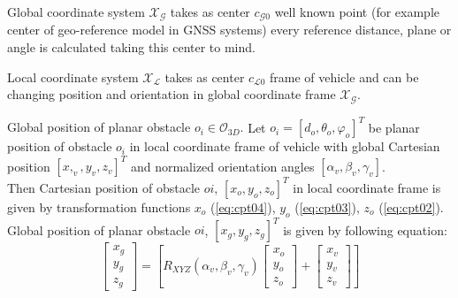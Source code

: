 \begin{definition}{Global coordinate system $\mathscr{X}_\mathscr{G}$}\label{def:globalCoordinateSystem}
    takes as center $c_{\mathscr{G}0}$ well known point (for example center of geo-reference model in GNSS systems) every reference distance, plane or angle is calculated taking this center to mind.
\end{definition}
\begin{definition}{Local coordinate system $\mathscr{X}_\mathscr{L}$}\label{def:localCoordinateSystem}
    takes as center $c_{\mathscr{L}0}$ frame of vehicle and can be changing position and orientation in global coordinate frame $\mathscr{X}_\mathscr{G}$.
\end{definition}
\begin{definition}{Global position of planar obstacle $o_i\in\mathscr{O}_{3D}$.}\label{def:globalObstaclePosition3D}
    Let $o_i = [d_o, \theta_o, \varphi_o]^T$ be planar position of obstacle $o_i$ in local coordinate frame of vehicle with global Cartesian position $[x,_v,y_v,z_v]^T$ and normalized orientation angles $[\alpha_v,\beta_v,\gamma_v]$.\\
    Then Cartesian position of obstacle $oi$, $[x_o,y_o,z_o]^T$  in local coordinate frame is given by transformation functions $x_o$ (\ref{eq:cpt04}), $y_o$ (\ref{eq:cpt03}), $z_o$ (\ref{eq:cpt02}).\\ 
    Global  position of planar obstacle $oi$, $[x_g,y_g,z_g]^T$ is given by following equation:
    \begin{equation}
        \begin{bmatrix}
            x_g\\y_g\\z_g
        \end{bmatrix}
        =
        \left [
            R_{XYZ}(\alpha_v,\beta_v,\gamma_v)
            \begin{bmatrix}
                x_o\\y_o\\z_o
            \end{bmatrix}
            +
            \begin{bmatrix}
                x_v\\y_v\\z_v
            \end{bmatrix}
        \right ]
    \end{equation}    
\end{definition}

